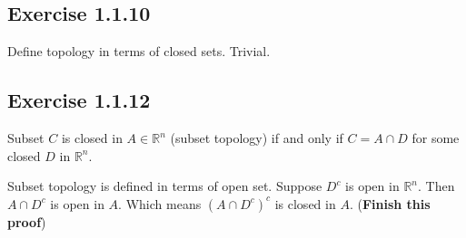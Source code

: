 \subsection*{Exercise 1.1.10}
Define topology in terms of closed sets. Trivial.

\subsection*{Exercise 1.1.12}
Subset $C$ is closed in $A \in \mathbb{R}^n$ (subset topology)
if and only if $C = A\cap D$ for some closed $D$ in $\mathbb{R}^n$.

Subset topology is defined in terms of open set. Suppose $D^c$ is open
in $\mathbb{R}^n$. Then $A\cap D^c$ is open in $A$. Which means 
$(A\cap D^c)^c$ is closed in $A$. ({\bf Finish this proof})

